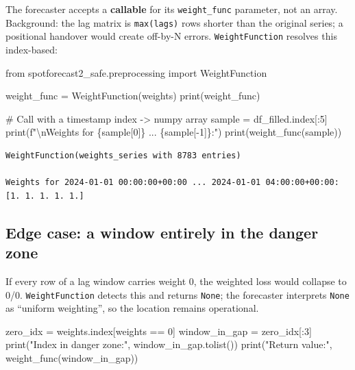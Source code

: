 \documentclass[
  english,
  letterpaper,
]{scrbook}
\newenvironment{Shaded}{\begin{snugshade}}{\end{snugshade}}
\newcommand{\BuiltInTok}[1]{\textcolor[rgb]{0.00,0.23,0.31}{#1}}
\newcommand{\CharTok}[1]{\textcolor[rgb]{0.13,0.47,0.30}{#1}}
\newcommand{\CommentTok}[1]{\textcolor[rgb]{0.37,0.37,0.37}{#1}}
\newcommand{\DecValTok}[1]{\textcolor[rgb]{0.68,0.00,0.00}{#1}}
\newcommand{\ImportTok}[1]{\textcolor[rgb]{0.00,0.46,0.62}{#1}}
\newcommand{\NormalTok}[1]{\textcolor[rgb]{0.00,0.23,0.31}{#1}}
\newcommand{\OperatorTok}[1]{\textcolor[rgb]{0.37,0.37,0.37}{#1}}
\newcommand{\SpecialCharTok}[1]{\textcolor[rgb]{0.37,0.37,0.37}{#1}}
\newcommand{\SpecialStringTok}[1]{\textcolor[rgb]{0.13,0.47,0.30}{#1}}
\newcommand{\StringTok}[1]{\textcolor[rgb]{0.13,0.47,0.30}{#1}}
\begin{document}
The forecaster accepts a \textbf{callable} for its \texttt{weight\_func}
parameter, not an array. Background: the lag matrix is
\texttt{max(lags)} rows shorter than the original series; a positional
handover would create off-by-N errors. \texttt{WeightFunction} resolves
this index-based:

\protect{}\label{wrap}
\begin{Shaded}
\begin{Highlighting}[]
\ImportTok{from}\NormalTok{ spotforecast2\_safe.preprocessing }\ImportTok{import}\NormalTok{ WeightFunction}

\NormalTok{weight\_func }\OperatorTok{=}\NormalTok{ WeightFunction(weights)}
\BuiltInTok{print}\NormalTok{(weight\_func)}

\CommentTok{\# Call with a timestamp index {-}\textgreater{} numpy array}
\NormalTok{sample }\OperatorTok{=}\NormalTok{ df\_filled.index[:}\DecValTok{5}\NormalTok{]}
\BuiltInTok{print}\NormalTok{(}\SpecialStringTok{f"}\CharTok{\textbackslash{}n}\SpecialStringTok{Weights for }\SpecialCharTok{\{}\NormalTok{sample[}\DecValTok{0}\NormalTok{]}\SpecialCharTok{\}}\SpecialStringTok{ ... }\SpecialCharTok{\{}\NormalTok{sample[}\OperatorTok{{-}}\DecValTok{1}\NormalTok{]}\SpecialCharTok{\}}\SpecialStringTok{:"}\NormalTok{)}
\BuiltInTok{print}\NormalTok{(weight\_func(sample))}
\end{Highlighting}
\end{Shaded}

\begin{verbatim}
WeightFunction(weights_series with 8783 entries)

Weights for 2024-01-01 00:00:00+00:00 ... 2024-01-01 04:00:00+00:00:
[1. 1. 1. 1. 1.]
\end{verbatim}

\subsection{Edge case: a window entirely in the danger
zone}\label{edge-case-a-window-entirely-in-the-danger-zone}

If every row of a lag window carries weight 0, the weighted loss would
collapse to 0/0. \texttt{WeightFunction} detects this and returns
\texttt{None}; the forecaster interprets \texttt{None} as ``uniform
weighting'', so the location remains operational.

\protect{}\label{edge-case}
\begin{Shaded}
\begin{Highlighting}[]
\NormalTok{zero\_idx }\OperatorTok{=}\NormalTok{ weights.index[weights }\OperatorTok{==} \DecValTok{0}\NormalTok{]}
\NormalTok{window\_in\_gap }\OperatorTok{=}\NormalTok{ zero\_idx[:}\DecValTok{3}\NormalTok{]}
\BuiltInTok{print}\NormalTok{(}\StringTok{"Index in danger zone:"}\NormalTok{, window\_in\_gap.tolist())}
\BuiltInTok{print}\NormalTok{(}\StringTok{"Return value:"}\NormalTok{, weight\_func(window\_in\_gap))}
\end{Highlighting}
\end{Shaded}
\end{document}
